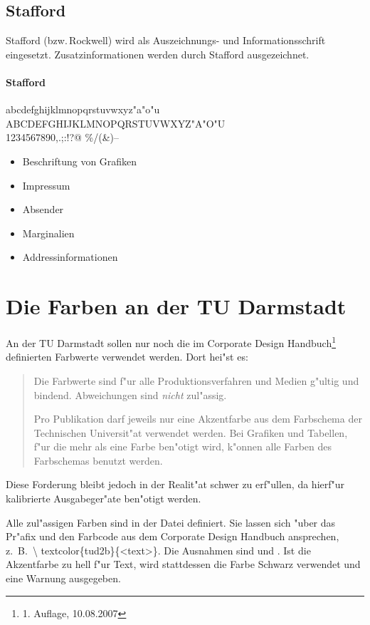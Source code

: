 \documentclass[twoside,colorback,accentcolor=tud4c,11pt]{tudreport}
\begin{document}
  \subsection{Stafford}
    Stafford (bzw.\,Rockwell) wird als Auszeichnungs- und Informationsschrift eingesetzt.
    Zusatzinformationen werden durch Stafford ausgezeichnet.
    \paragraph{Stafford}
      \hfill%
      \begin{minipage}{\textwidth-\the\parindent}
        \accentfont
        \noindent
        abcdefghijklmnopqrstuvwxyz"a"o"u\\
        ABCDEFGHIJKLMNOPQRSTUVWXYZ"A"O"U\\
        1234567890,.;:!?\glqq\grqq{}@ \texteuro\%/(\&)--
      \end{minipage}
      \begin{itemize}
        \item Beschriftung von Grafiken
        \item Impressum
        \item Absender
        \item Marginalien
        \item Addressinformationen
      \end{itemize}
  
  \section{Die Farben an der TU Darmstadt}
    
    An der TU Darmstadt sollen nur noch die im Corporate Design Handbuch\footnote{1.
    Auflage, 10.08.2007} definierten Farbwerte verwendet werden. Dort hei"st es:
    \begin{quote}
     Die Farbwerte sind f"ur alle Produktionsverfahren und Medien g"ultig
     und bindend. Abweichungen sind \emph{nicht} zul"assig.

     Pro Publikation darf jeweils nur eine Akzentfarbe aus dem Farbschema
     der Technischen Universit"at verwendet werden. Bei Grafiken und Tabellen,
     f"ur die mehr als eine Farbe ben"otigt wird, k"onnen alle Farben des
     Farbschemas benutzt werden.
    \end{quote}
  Diese Forderung bleibt jedoch in der Realit"at schwer zu erf"ullen, da
  hierf"ur kalibrierte Ausgabeger"ate ben"otigt werden.

  Alle zul"assigen Farben sind in der Datei 
  definiert. Sie lassen sich "uber das Pr"afix  und den Farbcode
  aus dem Corporate Design Handbuch ansprechen, z.\ B.\ \textcolor{tud2a}{\textbackslash
  textcolor\{tud2b\}\{<text>\}}. Die Ausnahmen sind  und .
  Ist die Akzentfarbe zu hell f"ur Text, wird stattdessen die Farbe Schwarz verwendet und
  eine Warnung ausgegeben.
  
\end{document}
